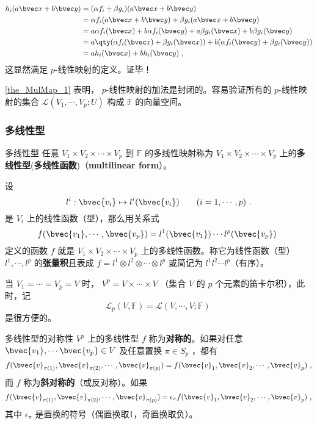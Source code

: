 \begin{equation}
\begin{aligned}
h_i(a \bvec x+b\bvec y)&=(\alpha f_i+\beta g_i)(a \bvec x+b\bvec y)\\
&=\alpha f_i(a \bvec x+b\bvec y)+\beta g_i(a \bvec x+b\bvec y)\\
&=a\alpha f_i(\bvec x)+b\alpha f_i(\bvec y)+a\beta g_i(\bvec x)+b\beta g_i(\bvec y)\\
&=a\qty(\alpha f_i(\bvec x)+\beta g_i(\bvec x))+b(\alpha f_i(\bvec y)+\beta g_i(\bvec y))\\
&=ah_i(\bvec x)+bh_i(\bvec y)~,
\end{aligned}
\end{equation}
这显然满足 $p$-线性映射的定义。证毕！

\autoref{the_MulMap_1} 表明， $p$-线性映射的加法是封闭的。容易验证所有的 $p$-线性映射的集合 $\mathcal{L}(V_1,\cdots,V_p;U)$ 构成 $\mathbb{F}$ 的向量空间。
\subsubsection{多线性型}
\begin{definition}{多线性型}\label{def_MulMap_2}
任意 $V_1\times V_2\times\cdots\times V_p$ 到 $\mathbb{F}$ 的多线性映射称为 $V_1\times V_2\times\cdots\times V_p$ 上的\textbf{多线性型}(\textbf{多线性函数})（\textbf{multilinear form}）。
\end{definition}
\begin{example}{}
设
\begin{equation}
l^i:\bvec{v_i}\mapsto l^i(\bvec{v_i})\qquad (i=1,\cdots,p)~.
\end{equation}
是 $V_i$ 上的线性函数（型），那么用关系式
\begin{equation}
f(\bvec{v_1},\cdots,\bvec{v_p})=l^1(\bvec{v_1})\cdots l^p(\bvec{v_p})~
\end{equation}
定义的函数 $f$ 就是 $V_1\times V_2\times\cdots\times V_p$ 上的多线性函数。称它为线性函数（型）$l^1,\cdots,l^p$ 的\textbf{张量积}且表成 $f=l^1\otimes l^2\otimes\cdots\otimes l^p$ 或简记为 $l^1l^2\cdots l^p$（有序）。
\end{example}
当 $V_1=\cdots=V_p=V$ 时， $V^p=V\times\cdots\times V$ （集合 $V$ 的 $p$ 个元素的笛卡尔积），此时，记
\begin{equation}
\mathcal{L}_p(V,\mathbb{F})=\mathcal{L}(V,\cdots,V;\mathbb{F})~
\end{equation}
是很方便的。
\begin{definition}{多线性型的对称性}\label{def_MulMap_1}
$V^p$ 上的多线性型 $f$ 称为\textbf{对称的}。如果对任意 $\bvec{v_1},\cdots\bvec{v_p}\in V$ 及任意置换 $\pi\in S_p$ ，都有
\begin{equation}
f(\bvec{v}_{\pi(1)},\bvec{v}_{\pi(2)},\cdots,\bvec{v}_{\pi(p)})=f(\bvec{v}_1,\bvec{v}_2,\cdots,\bvec{v}_p)~,
\end{equation}
而 $f$ 称为\textbf{斜对称的}（或反对称）。如果
\begin{equation}
f(\bvec{v}_{\pi(1)},\bvec{v}_{\pi(2)},\cdots,\bvec{v}_{\pi(p)})=\epsilon_\pi f(\bvec{v}_1,\bvec{v}_2,\cdots,\bvec{v}_p)~,
\end{equation}
其中 $\epsilon_\pi$ 是置换的符号（偶置换取1，奇置换取负）。
\end{definition}
